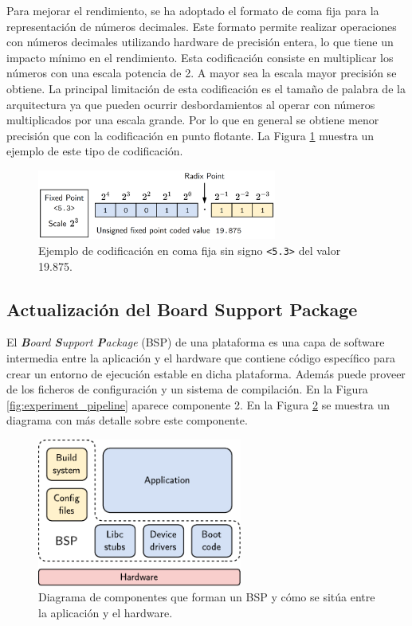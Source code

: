 Para mejorar el rendimiento, se ha adoptado el formato de coma fija para la representación de números decimales. Este formato permite realizar operaciones con números decimales utilizando hardware de precisión entera, lo que tiene un impacto mínimo en el rendimiento. Esta codificación consiste en multiplicar los números con una escala potencia de 2. A mayor sea la escala mayor precisión se obtiene. La principal limitación de esta codificación es el tamaño de palabra de la arquitectura ya que pueden ocurrir desbordamientos al operar con números multiplicados por una escala grande. Por lo que en general se obtiene menor precisión que con la codificación en punto flotante. La Figura \ref{fig:fixed_point} muestra un ejemplo de este tipo de codificación.

\begin{figure}[h]
	\centering
	\includegraphics[width=0.7\textwidth]{root/Imagenes/metodologia/fixed_point.png}
	\caption{Ejemplo de codificación en coma fija sin signo \texttt{<5.3>} del valor 19.875.}
	\label{fig:fixed_point}
\end{figure}

\subsection{Actualización del Board Support Package}

El \textit{\textbf{B}oard \textbf{S}upport \textbf{P}ackage} (BSP) de una plataforma es una capa de software intermedia entre la aplicación y el hardware que contiene código específico para crear un entorno de ejecución estable en dicha plataforma. Además puede proveer de los ficheros de configuración y un sistema de compilación. En la Figura \ref{fig:experiment_pipeline} aparece componente 2. En la Figura \ref{fig:bsp} se muestra un diagrama con más detalle sobre este componente.

\begin{figure}[h]
	\centering
	\includegraphics[width=0.6\textwidth]{root/Imagenes/metodologia/bsp.pdf}
	\caption{Diagrama de componentes que forman un BSP y cómo se sitúa entre la aplicación y el hardware.}
	\label{fig:bsp}
\end{figure}

